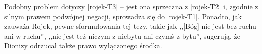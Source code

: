 %
%
%

Podobny problem dotyczy \eqref{rojek-T3} -- jest ona sprzeczna z \eqref{rojek-T2} i, zgodnie z
silnym prawem podwójnej negacji, sprowadza się do \eqref{rojek-T1}. Ponadto, jak
zauważa Rojek, pewne sformułowania tej tezy, takie jak ,,[Bóg] nie jest
bez ruchu ani w ruchu'', ,,nie jest też niczym z niebytu ani czymś z
bytu'', sugerują, że Dionizy odrzucał także prawo wyłączonego środka.

